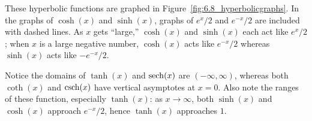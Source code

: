 
These hyperbolic functions are graphed in Figure~\ref{fig:6.8_hyperbolicgraphs}. In the graphs of $\cosh (x)$ and $\sinh (x)$, graphs of $e^x/2$ and $e^{-x}/2$ are included with dashed lines. As $x$ gets ``large,'' $\cosh (x)$ and $\sinh (x)$ each act like $e^x/2$; when $x$ is a large negative number, $\cosh (x)$ acts like $e^{-x}/2$ whereas $\sinh (x)$ acts like $-e^{-x}/2$.


Notice the domains of $\tanh (x)$ and $\operatorname{sech} (x)$ are $(-\infty,\infty)$, whereas both $\coth (x)$ and $\operatorname{csch} (x)$ have vertical asymptotes at $x=0$. Also note the ranges of these function, especially $\tanh (x)$: as $x\to\infty$, both $\sinh (x)$ and $\cosh (x)$ approach $e^{-x}/2$, hence $\tanh (x)$ approaches $1$.

